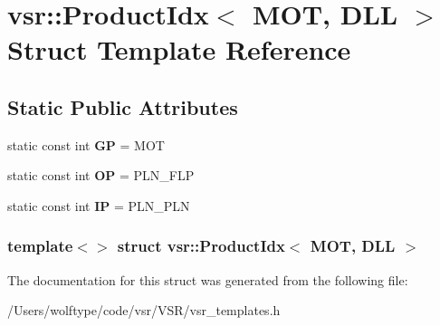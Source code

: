 \hypertarget{structvsr_1_1_product_idx_3_01_m_o_t_00_01_d_l_l_01_4}{\section{vsr\-:\-:Product\-Idx$<$ M\-O\-T, D\-L\-L $>$ Struct Template Reference}
\label{structvsr_1_1_product_idx_3_01_m_o_t_00_01_d_l_l_01_4}
}
\subsection*{Static Public Attributes}
\begin{DoxyCompactItemize}
\item 
\hypertarget{structvsr_1_1_product_idx_3_01_m_o_t_00_01_d_l_l_01_4_ae8ebba7720c57201f51b1f152c0480cb}{static const int {\bfseries G\-P} = M\-O\-T}\label{structvsr_1_1_product_idx_3_01_m_o_t_00_01_d_l_l_01_4_ae8ebba7720c57201f51b1f152c0480cb}

\item 
\hypertarget{structvsr_1_1_product_idx_3_01_m_o_t_00_01_d_l_l_01_4_ae8f8cf24b2dcfb11d3dc4ac28e9ce316}{static const int {\bfseries O\-P} = P\-L\-N\-\_\-\-F\-L\-P}\label{structvsr_1_1_product_idx_3_01_m_o_t_00_01_d_l_l_01_4_ae8f8cf24b2dcfb11d3dc4ac28e9ce316}

\item 
\hypertarget{structvsr_1_1_product_idx_3_01_m_o_t_00_01_d_l_l_01_4_a71ed75792332722b93a7a24d7c498b6f}{static const int {\bfseries I\-P} = P\-L\-N\-\_\-\-P\-L\-N}\label{structvsr_1_1_product_idx_3_01_m_o_t_00_01_d_l_l_01_4_a71ed75792332722b93a7a24d7c498b6f}

\end{DoxyCompactItemize}
\subsubsection*{template$<$$>$ struct vsr\-::\-Product\-Idx$<$ M\-O\-T, D\-L\-L $>$}



The documentation for this struct was generated from the following file\-:\begin{DoxyCompactItemize}
\item 
/\-Users/wolftype/code/vsr/\-V\-S\-R/vsr\-\_\-templates.\-h\end{DoxyCompactItemize}
